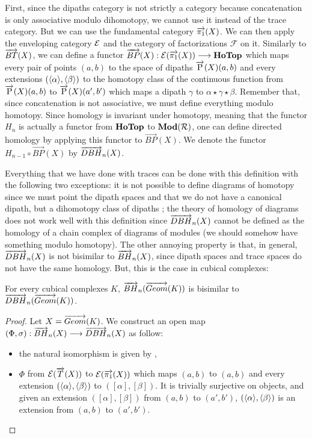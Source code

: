 First, since the dipaths category is not strictly a category because concatenation is only associative modulo dihomotopy, we cannot use it instead of the trace category. But we can use the fundamental category $\overrightarrow{\pi_1}(X)$. We can then apply the enveloping category $\mathcal{E}$ and the category of factorizations $\mathcal{F}$ on it. Similarly to $\overrightarrow{BT}(X)$, we can define a functor $\overrightarrow{BP}(X) : \mathcal{E}(\overrightarrow{\pi_1}(X)) \longrightarrow \textbf{HoTop}$ which maps every pair of points $(a,b)$ to the space of dipaths $\overrightarrow{\text{P}}(X)(a,b)$ and every extensions $(\langle\alpha\rangle,\langle\beta\rangle)$ to the homotopy class of the continuous function from $\overrightarrow{\text{P}}(X)(a,b)$ to $\overrightarrow{\text{P}}(X)(a',b')$ which maps a dipath $\gamma$ to $\alpha\star\gamma\star\beta$. Remember that, since concatenation is not associative, we must define everything modulo homotopy. Since homology is invariant under homotopy, meaning that the functor $H_n$ is actually a functor from $\textbf{HoTop}$ to $\textbf{Mod}(\mathcal{R})$, one can define directed homology by applying this functor to $\overrightarrow{BP}(X)$. We denote the functor $H_{n-1}\circ\overrightarrow{BP}(X)$ by $\overrightarrow{DBH}_{n}(X)$. 

Everything that we have done with traces can be done with this definition with the following two exceptions: it is not possible to define diagrams of homotopy since we must point the dipath spaces and that we do not have a canonical dipath, but a dihomotopy class of dipaths ; the theory of homology of diagrams does not work well with this definition since $\overrightarrow{DBH}_{n}(X)$ cannot be defined as the homology of a chain complex of diagrams of modules (we should somehow have something modulo homotopy). The other annoying property is that, in general, $\overrightarrow{DBH}_{n}(X)$ is not bisimilar to $\overrightarrow{BH}_{n}(X)$, since dipath spaces and trace spaces do not have the same homology. But, this is the case in cubical complexes:

\begin{prop}
For every cubical complexes $K$, $\overrightarrow{BH}_{n}(\overrightarrow{Geom}(K))$ is bisimilar to $\overrightarrow{DBH}_{n}(\overrightarrow{Geom}(K))$.
\end{prop}


\begin{proof}
Let $X = \overrightarrow{Geom}(K)$. We construct an open map $(\Phi,\sigma) : \overrightarrow{BH}_{n}(X) \longrightarrow \overrightarrow{DBH}_{n}(X)$ as follow:
\begin{itemize}
	\item the natural isomorphism is given by \cite{raussen09},
	\item $\Phi$ from $\mathcal{E}(\overrightarrow{T}(X))$ to $\mathcal{E}(\overrightarrow{\pi_1}(X))$ which maps $(a,b)$ to $(a,b)$ and every extension $(\langle\alpha\rangle,\langle\beta\rangle)$ to $([\alpha],[\beta])$. It is trivially surjective on objects, and given an extension $([\alpha],[\beta])$ from $(a,b)$ to $(a',b')$, $(\langle\alpha\rangle,\langle\beta\rangle)$ is an extension from $(a,b)$ to $(a',b')$.
\end{itemize}
\end{proof}


